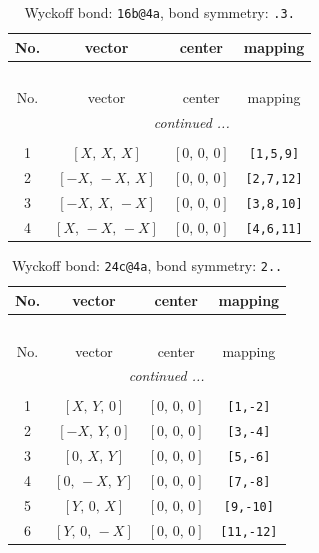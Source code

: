 \documentclass[fleqn,8pt]{jsarticle}
\begin{document}
\begin{longtable}{cccc}
\caption{Wyckoff bond: {\tt 16b@4a}, bond symmetry: {\tt .3.}}
 \\
 \hline \hline
No. & vector & center & mapping \\ \hline \endfirsthead

\multicolumn{3}{l}{\tablename\ \thetable{}} \\
 \hline \hline
No. & vector & center & mapping \\ \hline \endhead

 \hline \hline
\multicolumn{3}{r}{\footnotesize\it continued ...} \\ \endfoot

 \hline \hline
\multicolumn{3}{r}{} \\ \endlastfoot

1 & $\left[ X,\, X,\, X \right]$ & $\left[ 0,\, 0,\, 0 \right]$ & {\tt [1,5,9]} \\ \hline
2 & $\left[ - X,\, - X,\, X \right]$ & $\left[ 0,\, 0,\, 0 \right]$ & {\tt [2,7,12]} \\ \hline
3 & $\left[ - X,\, X,\, - X \right]$ & $\left[ 0,\, 0,\, 0 \right]$ & {\tt [3,8,10]} \\ \hline
4 & $\left[ X,\, - X,\, - X \right]$ & $\left[ 0,\, 0,\, 0 \right]$ & {\tt [4,6,11]} \\
\end{longtable}
\renewcommand{\arraystretch}{1.2}
\begin{longtable}{cccc}
\caption{Wyckoff bond: {\tt 24c@4a}, bond symmetry: {\tt 2..}}
 \\
 \hline \hline
No. & vector & center & mapping \\ \hline \endfirsthead

\multicolumn{3}{l}{\tablename\ \thetable{}} \\
 \hline \hline
No. & vector & center & mapping \\ \hline \endhead

 \hline \hline
\multicolumn{3}{r}{\footnotesize\it continued ...} \\ \endfoot

 \hline \hline
\multicolumn{3}{r}{} \\ \endlastfoot

1 & $\left[ X,\, Y,\, 0 \right]$ & $\left[ 0,\, 0,\, 0 \right]$ & {\tt [1,-2]} \\ \hline
2 & $\left[ - X,\, Y,\, 0 \right]$ & $\left[ 0,\, 0,\, 0 \right]$ & {\tt [3,-4]} \\ \hline
3 & $\left[ 0,\, X,\, Y \right]$ & $\left[ 0,\, 0,\, 0 \right]$ & {\tt [5,-6]} \\ \hline
4 & $\left[ 0,\, - X,\, Y \right]$ & $\left[ 0,\, 0,\, 0 \right]$ & {\tt [7,-8]} \\ \hline
5 & $\left[ Y,\, 0,\, X \right]$ & $\left[ 0,\, 0,\, 0 \right]$ & {\tt [9,-10]} \\ \hline
6 & $\left[ Y,\, 0,\, - X \right]$ & $\left[ 0,\, 0,\, 0 \right]$ & {\tt [11,-12]} \\
\end{longtable}
\end{document}
